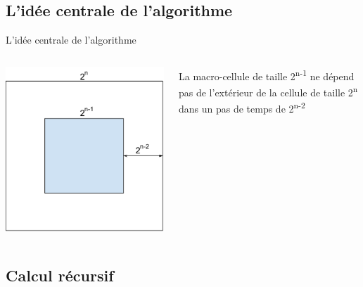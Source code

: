 \documentclass{beamer}
\begin{document}
\subsection{L'idée centrale de l'algorithme}

\begin{frame}{L'idée centrale de l'algorithme}

\begin{columns}[c]
  \begin{column}{5cm}
    \includegraphics[scale=0.2]{result.png}
  \end{column}
  \begin{column}{5cm}
    La macro-cellule de taille 2\textsuperscript{n-1} ne dépend
    pas de l'extérieur de la cellule de taille 2\textsuperscript{n}
    dans un pas de temps de 2\textsuperscript{n-2}
  \end{column}
\end{columns}

\end{frame}

\subsection{Calcul récursif}
\end{document}
